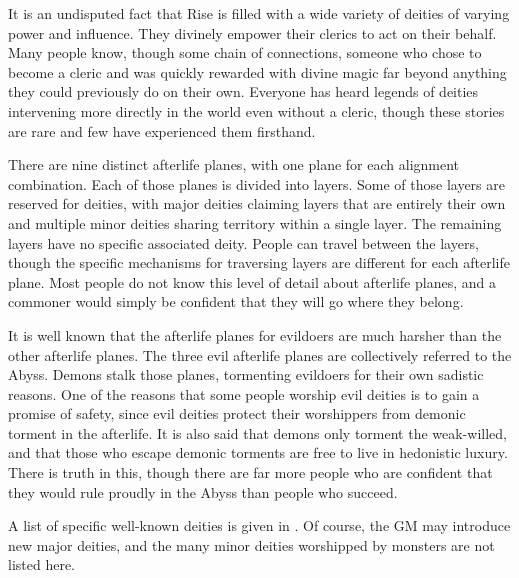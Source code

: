   It is an undisputed fact that Rise is filled with a wide variety of deities of varying power and influence.
  They divinely empower their clerics to act on their behalf.
  Many people know, though some chain of connections, someone who chose to become a cleric and was quickly rewarded with divine magic far beyond anything they could previously do on their own.
  Everyone has heard legends of deities intervening more directly in the world even without a cleric, though these stories are rare and few have experienced them firsthand.

  There are nine distinct afterlife planes, with one plane for each alignment combination.
  Each of those planes is divided into layers.
  Some of those layers are reserved for deities, with major deities claiming layers that are entirely their own and multiple minor deities sharing territory within a single layer.
  The remaining layers have no specific associated deity.
  People can travel between the layers, though the specific mechanisms for traversing layers are different for each afterlife plane.
  Most people do not know this level of detail about afterlife planes, and a commoner would simply be confident that they will go where they belong.

  It is well known that the afterlife planes for evildoers are much harsher than the other afterlife planes.
  The three evil afterlife planes are collectively referred to the Abyss.
  Demons stalk those planes, tormenting evildoers for their own sadistic reasons.
  One of the reasons that some people worship evil deities is to gain a promise of safety, since evil deities protect their worshippers from demonic torment in the afterlife.
  It is also said that demons only torment the weak-willed, and that those who escape demonic torments are free to live in hedonistic luxury.
  There is truth in this, though there are far more people who are confident that they would rule proudly in the Abyss than people who succeed.

  A list of specific well-known deities is given in .
  Of course, the GM may introduce new major deities, and the many minor deities worshipped by monsters are not listed here.

